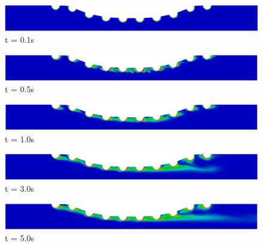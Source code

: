 \begin{figure}[H]
     \begin{minipage}{.50\linewidth}
      \centering
      \includegraphics[scale=0.18]{./02_chaps/cap_solution/figure/conc1000_CurvedStrut1.png}\\
      t = 0.1s
     \end{minipage}%
     \begin{minipage}{.50\linewidth}
      \centering
      \includegraphics[scale=0.18]{./02_chaps/cap_solution/figure/conc1000_CurvedStrut2.png}\\
      t = 0.5s
     \end{minipage}
     \begin{minipage}{.50\linewidth}
     \medskip
      \centering
      \includegraphics[scale=0.18]{./02_chaps/cap_solution/figure/conc1000_CurvedStrut3.png}\\
      t = 1.0s
     \end{minipage}%
     \begin{minipage}{.50\linewidth}
     \medskip
      \centering
      \includegraphics[scale=0.18]{./02_chaps/cap_solution/figure/conc1000_CurvedStrut4.png}\\
      t = 3.0s
     \end{minipage}
     \begin{minipage}{.50\linewidth}
      \centering
      \includegraphics[scale=0.18]{./02_chaps/cap_solution/figure/conc1000_CurvedStrut5.png}\\
      t = 5.0s
     \end{minipage}%

\end{figure}

